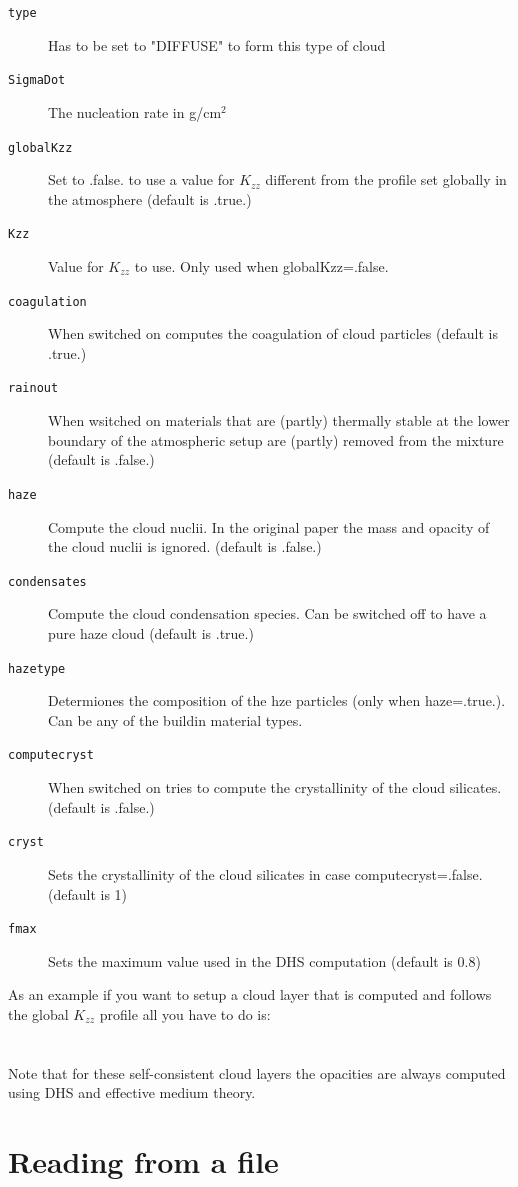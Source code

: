 \documentclass[12pt]{article}
\begin{document}
\begin{description}
\item[\texttt{type}]
Has to be set to "DIFFUSE" to form this type of cloud
\item[\texttt{SigmaDot}]
The nucleation rate in g/cm$^2$
\item[\texttt{globalKzz}]
Set to .false. to use a value for $K_{zz}$ different from the profile set globally in the atmosphere (default is .true.)
\item[\texttt{Kzz}]
Value for $K_{zz}$ to use. Only used when globalKzz=.false.
\item[\texttt{coagulation}] 
When switched on computes the coagulation of cloud particles (default is .true.)
\item[\texttt{rainout}] 
When wsitched on materials that are (partly) thermally stable at the lower boundary of the atmospheric setup are (partly) removed from the mixture (default is .false.)
\item[\texttt{haze}]
Compute the cloud nuclii. In the original paper the mass and opacity of the cloud nuclii is ignored. (default is .false.)
\item[\texttt{condensates}]
Compute the cloud condensation species. Can be switched off to have a pure haze cloud (default is .true.)
\item[\texttt{hazetype}]
Determiones the composition of the hze particles (only when haze=.true.). Can be any of the buildin material types.
\item[\texttt{computecryst}] 
When switched on tries to compute the crystallinity of the cloud silicates. (default is .false.)
\item[\texttt{cryst}]
Sets the crystallinity of the cloud silicates in case computecryst=.false. (default is 1)
\item[\texttt{fmax}]
Sets the maximum value used in the DHS computation (default is 0.8)
\end{description}

As an example if you want to setup a cloud layer that is computed and follows the global $K_{zz}$ profile all you have to do is:
\\
\\
\\
Note that for these self-consistent cloud layers the opacities are always computed using DHS and effective medium theory.

\section{Reading from a file}
\end{document}
